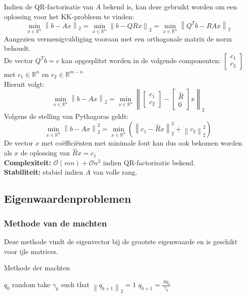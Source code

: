 \documentclass{article}
\newcommand{\norm}[1]{\left\lVert#1\right\rVert}
\begin{document}
	Indien de QR-factorisatie van $A$ bekend is, kan deze gebruikt worden om een oplossing voor het KK-probleem te vinden:
	$$
	\min_{x \in \mathbb{R}^n} \norm{b-Ax}_2  
	= \min_{x \in \mathbb{R}^n} \norm{b-QRx}_2
	= \min_{x \in \mathbb{R}^n} \norm{Q^Tb-RAx}_2 
	$$
	Aangezien vermenigvuldiging vooraan met een orthogonale matrix de norm behoudt. \\	
	De  vector $Q^Tb=c$ kan opgesplitst worden in  de volgende componenten:
	$
	\begin{bmatrix}
		c_1\\
		c_2
	\end{bmatrix}
	$
	met $c_1 \in \mathbb{R}^n$ en $c_2 \in \mathbb{R}^{m-n}$\\
	Hieruit volgt:
	$$
	\min_{x \in \mathbb{R}^n} \norm{b-Ax}_2 
	= 	\min_{x \in \mathbb{R}^n} \norm{
		\begin{bmatrix}
		c_1\\
		c_2
		\end{bmatrix}
		-
		\begin{bmatrix}
			\hat{R}\\
			0
		\end{bmatrix}
		x}_2 
	$$
	Volgens de stelling van Pythagoras geldt:
	$$
	\min_{x \in \mathbb{R}^n} \norm{b-Ax}_2^2
	= \min_{x \in \mathbb{R}^n} (\norm{c_1-\hat{R}x}_2^2 + \norm{c_2}_2^2)
	$$
	De vector $x$ met coëfficiënten met minimale fout kan dus ook bekomen worden als $x$ de oplossing van $\hat{R}x = c_1$\\
	
	\textbf{Complexiteit:} $\mathcal{O}(mn) + \mathcal{O}n^2$ indien QR-factorisatie bekend.\\
	\textbf{Stabiliteit:} stabiel indien $A$ van volle rang.
	

	\subsection{Eigenwaardenproblemen}
	
	\subsubsection{Methode van de machten}
	Deze methode vindt de eigenvector bij de grootste eigenwaarde en is geschikt voor ijle matrices.
	
	\begin{algorithm}[!ht]
		\caption{Methode der machten}
		\begin{algorithmic}[1]
				\State $q_0$ random
					\State take $\gamma_k$ such that $\norm{q_{k+1}}_2 = 1$
					\State $q_{k+1} = \frac{Aq_k}{\gamma_k} $
				\EndFor
			\EndProcedure
		\end{algorithmic}
	\end{algorithm}
\end{document}
